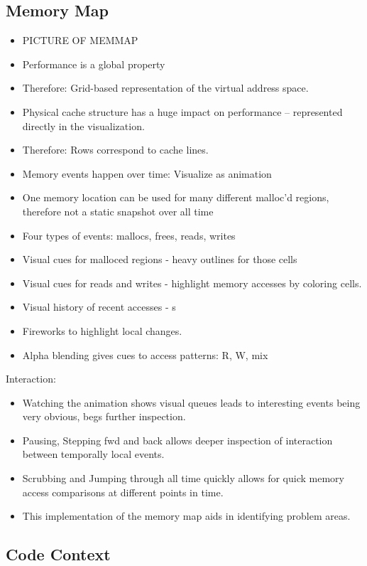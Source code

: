 \documentclass[annual]{acmsiggraph}
\begin{document}
  \subsection{Memory Map}
    \begin{itemize}
      \item PICTURE OF MEMMAP
      \item Performance is a global property 
      \item Therefore: Grid-based representation of the virtual address space.
      \item Physical cache structure has a huge impact on performance -- represented directly in the visualization.    
      \item Therefore: Rows correspond to cache lines.
      \item Memory events happen over time: Visualize as animation
      \item One memory location can be used for many different malloc'd regions, therefore not a static snapshot over all time
      \item Four types of events: mallocs, frees, reads, writes
      \item Visual cues for malloced regions - heavy outlines for those cells
      \item Visual cues for reads and writes - highlight memory accesses by coloring cells.
      \item Visual history of recent accesses - s
      \item Fireworks to highlight local changes.
      \item Alpha blending gives cues to access patterns: R, W, mix
   \end{itemize}

Interaction:
   \begin{itemize}   
      \item Watching the animation shows visual queues leads to interesting events being very obvious, begs further inspection.
      \item Pausing, Stepping fwd and back allows deeper inspection of interaction between temporally local events.
      \item Scrubbing and Jumping through all time quickly allows for quick memory access comparisons at different points in time.
      \item This implementation of the memory map aids in identifying problem areas.
    \end{itemize}
  
  \subsection{Code Context}
\end{document}
